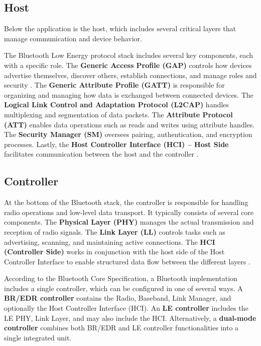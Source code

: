 \subsection{Host}

Below the application is the host, which includes several critical layers that manage communication and device behavior.

The Bluetooth Low Energy protocol stack includes several key components, each with a specific role. The \textbf{Generic Access Profile (GAP)} controls how devices advertise themselves, discover others, establish connections, and manage roles and security \cite{nextgenBLE}. The \textbf{Generic Attribute Profile (GATT)} is responsible for organizing and managing how data is exchanged between connected devices. The \textbf{Logical Link Control and Adaptation Protocol (L2CAP)} handles multiplexing and segmentation of data packets. The \textbf{Attribute Protocol (ATT)} enables data operations such as reads and writes using attribute handles. The \textbf{Security Manager (SM)} oversees pairing, authentication, and encryption processes. Lastly, the \textbf{Host Controller Interface (HCI) – Host Side} facilitates communication between the host and the controller \cite{nextgenBLE}.

\subsection{Controller}

At the bottom of the Bluetooth stack, the controller is responsible for handling radio operations and low-level data transport. It typically consists of several core components. The \textbf{Physical Layer (PHY)} manages the actual transmission and reception of radio signals. The \textbf{Link Layer (LL)} controls tasks such as advertising, scanning, and maintaining active connections. The \textbf{HCI (Controller Side)} works in conjunction with the host side of the Host Controller Interface to enable structured data flow between the different layers \cite{nextgenBLE}.

According to the Bluetooth Core Specification, a Bluetooth implementation includes a single controller, which can be configured in one of several ways. A \textbf{BR/EDR controller} contains the Radio, Baseband, Link Manager, and optionally the Host Controller Interface (HCI). An \textbf{LE controller} includes the LE PHY, Link Layer, and may also include the HCI. Alternatively, a \textbf{dual-mode controller} combines both BR/EDR and LE controller functionalities into a single integrated unit.

